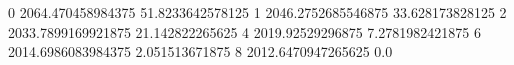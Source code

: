 0 2064.470458984375 51.8233642578125
1 2046.2752685546875 33.628173828125
2 2033.7899169921875 21.142822265625
4 2019.92529296875 7.2781982421875
6 2014.6986083984375 2.051513671875
8 2012.6470947265625 0.0
